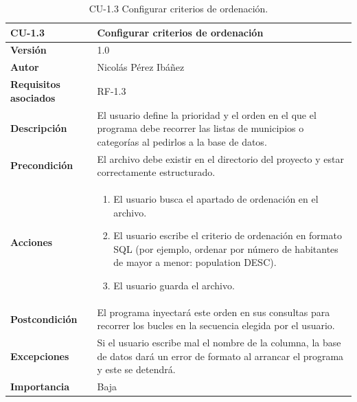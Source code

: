 \begin{table}[p]
	\centering
	\begin{tabularx}{\linewidth}{ p{} p{} }
		\toprule
		\textbf{CU-1.3}    & \textbf{Configurar criterios de ordenación}\\
		\toprule
		\textbf{Versión}              & 1.0    \\
		\textbf{Autor}                & Nicolás Pérez Ibáñez \\
		\textbf{Requisitos asociados} & RF-1.3 \\
		\textbf{Descripción}          & El usuario define la prioridad y el orden en el que el programa debe recorrer las listas de municipios o categorías al pedirlos a la base de datos. \\
		\textbf{Precondición}         & El archivo \ruta{config/config.json} debe existir en el directorio del proyecto y estar correctamente estructurado. \\
		\textbf{Acciones}             &
		\begin{enumerate}
			\def\labelenumi{\arabic{enumi}.}
			\tightlist
			\item El usuario busca el apartado de ordenación en el archivo.
			\item El usuario escribe el criterio de ordenación en formato SQL (por ejemplo, ordenar por número de habitantes de mayor a menor: population DESC).
			\item El usuario guarda el archivo.
		\end{enumerate}\\
		\textbf{Postcondición}        & El programa inyectará este orden en sus consultas para recorrer los bucles en la secuencia elegida por el usuario. \\
		\textbf{Excepciones}          & Si el usuario escribe mal el nombre de la columna, la base de datos dará un error de formato al arrancar el programa y este se detendrá. \\
		\textbf{Importancia}          & Baja \\
		\bottomrule
	\end{tabularx}
	\caption{CU-1.3 Configurar criterios de ordenación.}
\end{table}

